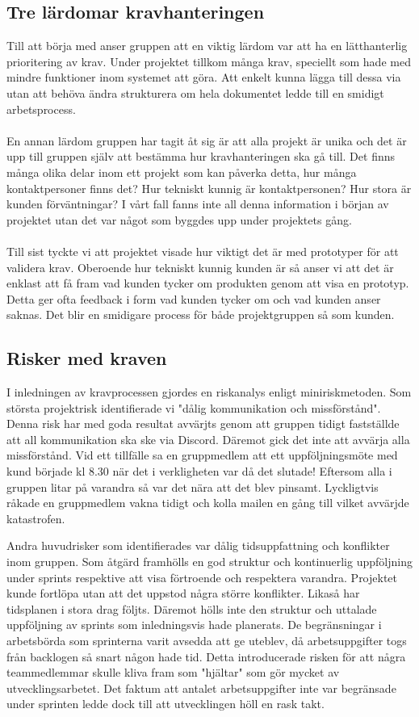 \documentclass[12pt]{article}
\begin{document}
\subsection{Tre lärdomar kravhanteringen}
Till att börja med anser gruppen att en viktig lärdom var att ha en lätthanterlig prioritering av krav. Under projektet tillkom många krav, speciellt som hade med mindre funktioner inom systemet att göra. Att enkelt kunna lägga till dessa via utan att behöva ändra strukturera om hela dokumentet ledde till en smidigt arbetsprocess.
\\\\
En annan lärdom gruppen har tagit åt sig är att alla projekt är unika och det är upp till gruppen själv att bestämma hur kravhanteringen ska gå till. Det finns många olika delar inom ett projekt som kan påverka detta, hur många kontaktpersoner finns det? Hur tekniskt kunnig är kontaktpersonen? Hur stora är kunden förväntningar? I vårt fall fanns inte all denna information i början av projektet utan det var något som byggdes upp under projektets gång. 
\\\\
Till sist tyckte vi att projektet visade hur viktigt det är med prototyper för att validera krav. Oberoende hur tekniskt kunnig kunden är så anser vi att det är enklast att få fram vad kunden tycker om produkten genom att visa en prototyp. Detta ger ofta feedback i form vad kunden tycker om och vad kunden anser saknas. Det blir en smidigare process för både projektgruppen så som kunden.

\subsection{Risker med kraven}

I inledningen av kravprocessen gjordes en riskanalys enligt miniriskmetoden. Som största projektrisk identifierade vi "dålig kommunikation och missförstånd". Denna risk har med goda resultat avvärjts genom att gruppen tidigt fastställde att all kommunikation ska ske via Discord. Däremot gick det inte att avvärja alla missförstånd. Vid ett tillfälle sa en gruppmedlem att ett uppföljningsmöte med kund började kl 8.30 när det i verkligheten var då det slutade! Eftersom alla i gruppen litar på varandra så var det nära att det blev pinsamt. Lyckligtvis råkade en gruppmedlem vakna tidigt och kolla mailen en gång till vilket avvärjde katastrofen. 

Andra huvudrisker som identifierades var dålig tidsuppfattning och konflikter inom gruppen. Som åtgärd framhölls en god struktur och kontinuerlig uppföljning under sprints respektive att visa förtroende och respektera varandra. Projektet kunde fortlöpa utan att det uppstod några större konflikter. Likaså har tidsplanen i stora drag följts. Däremot hölls inte den struktur och uttalade uppföljning av sprints som inledningsvis hade planerats. De begränsningar i arbetsbörda som sprinterna varit avsedda att ge uteblev, då arbetsuppgifter togs från backlogen så snart någon hade tid. Detta introducerade risken för att några teammedlemmar skulle kliva fram som "hjältar" som gör mycket av utvecklingsarbetet. Det faktum att antalet arbetsuppgifter inte var begränsade under sprinten ledde dock till att utvecklingen höll en rask takt.
\end{document}
